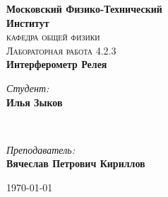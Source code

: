\documentclass[a4paper, 12pt]{article}
\newenvironment{bottompar}{\par\vspace*{\fill}}{\clearpage}
\begin{document}
\begin{titlepage}

\newcommand{\HRule}{\rule{\linewidth}{0.5mm}} %

\center %
 

\textbf{\LARGE Московский Физико-Технический}
\\[5pt]
\textbf{\LARGE Институт}\\[1,5cm] %
\textsc{\Large кафедра общей физики}\\[0.5cm] %
\textsc{\large Лабораторная работа  4.2.3}\\[0.9cm] %




{ \huge \bfseries Интерферометр Релея}
\\[1.7cm] %




 

\begin{minipage}{0.3\textwidth}
	\begin{flushleft} \large
		\emph{Студент:}\\
		\textbf{Илья  Зыков}%
	\end{flushleft}
\end{minipage}
~
\begin{minipage}{0.5\textwidth}
	\begin{flushright} \large
		\emph{Преподаватель:} \\
		\textbf{Вячеслав Петрович Кириллов} %
	\end{flushright}
\end{minipage}

\begin{bottompar}
	
	{\large \today}

\end{bottompar}
\vfill %

\end{titlepage}
\end{document}

